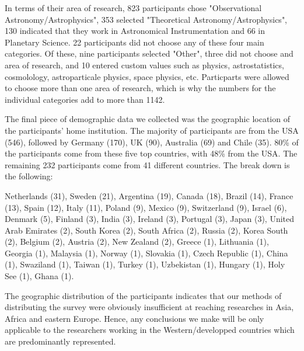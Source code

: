 In terms of their area of research, 823 participants chose "Observational Astronomy/Astrophysics", 353 selected "Theoretical Astronomy/Astrophysics", 130 indicated that they work in Astronomical Instrumentation and 66 in Planetary Science. 22 participants did not choose any of these four main categories. Of these, nine participants selected "Other", three did not choose and area of research, and 10 entered custom values such as physics, astrostatistics, cosmolology, astroparticale physics, space physics, etc. Particparts were allowed to choose more than one area of research, which is why the numbers for the individual categories add to more than 1142. 

The final piece of demographic data we collected was the geographic location of the participants' home institution. The majority of participants are from the USA (546), followed by Germany (170), UK (90), Australia (69) and Chile (35). 80\% of the participants come from these five top countries, with 48\% from the USA. The remaining 232 participants come from 41 different countries. The break down is the following:

             Netherlands     (31),
                  Sweden     (21),
               Argentina     (19),
                  Canada     (18),
                  Brazil     (14),
                  France     (13),
                   Spain     (12),
                   Italy     (11),
                  Poland      (9),
                  Mexico      (9),
             Switzerland      (9),
                  Israel      (6),
                 Denmark      (5),
                 Finland      (3),
                   India      (3),
                 Ireland      (3),
                Portugal      (3),
                   Japan      (3),
    United Arab Emirates      (2),
             South Korea      (2),
            South Africa      (2),
                  Russia      (2),
             Korea South      (2),
                 Belgium      (2),
                 Austria      (2),
             New Zealand      (2),
                  Greece      (1),
               Lithuania      (1),
                 Georgia      (1),
                Malaysia      (1),
                  Norway      (1),
                Slovakia      (1),
          Czech Republic      (1),
                   China      (1),
               Swaziland      (1),
                  Taiwan      (1),
                  Turkey      (1),
              Uzbekistan      (1),
                 Hungary      (1),
                Holy See      (1),
                   Ghana      (1).
                   
The geographic distribution of the participants indicates that our methods of distributing the survey were obviously insufficient at reaching researches in Asia, Africa and eastern Europe. Hence, any conclusions we make will be only applicable to the researchers working in the Western/developped countries which are predominantly represented.